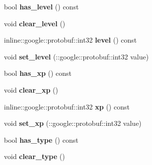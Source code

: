 \begin{DoxyCompactItemize}
\item 
\hypertarget{classproto_1_1_character_a7016b617afed8d8fad389e98e0334c08}{}bool {\bfseries has\+\_\+level} () const \label{classproto_1_1_character_a7016b617afed8d8fad389e98e0334c08}

\item 
\hypertarget{classproto_1_1_character_a3246999c221082b103293f9364c1ca53}{}void {\bfseries clear\+\_\+level} ()\label{classproto_1_1_character_a3246999c221082b103293f9364c1ca53}

\item 
\hypertarget{classproto_1_1_character_a3a41a2977c7f606776afdecdbc0632ad}{}inline\+::google\+::protobuf\+::int32 {\bfseries level} () const \label{classproto_1_1_character_a3a41a2977c7f606776afdecdbc0632ad}

\item 
\hypertarget{classproto_1_1_character_a98b7e3aa3ac98e40c07e09927ee56add}{}void {\bfseries set\+\_\+level} (\+::google\+::protobuf\+::int32 value)\label{classproto_1_1_character_a98b7e3aa3ac98e40c07e09927ee56add}

\item 
\hypertarget{classproto_1_1_character_a4d2ad8c78423b56dfc7a01ef406292f6}{}bool {\bfseries has\+\_\+xp} () const \label{classproto_1_1_character_a4d2ad8c78423b56dfc7a01ef406292f6}

\item 
\hypertarget{classproto_1_1_character_a574987e0da4ee8fd74cc4bebf3faf1ea}{}void {\bfseries clear\+\_\+xp} ()\label{classproto_1_1_character_a574987e0da4ee8fd74cc4bebf3faf1ea}

\item 
\hypertarget{classproto_1_1_character_a511446bb40bf4e2cd7eb19f26aed742d}{}inline\+::google\+::protobuf\+::int32 {\bfseries xp} () const \label{classproto_1_1_character_a511446bb40bf4e2cd7eb19f26aed742d}

\item 
\hypertarget{classproto_1_1_character_aaad1c4ee91ac67a99c1e9f16c0037756}{}void {\bfseries set\+\_\+xp} (\+::google\+::protobuf\+::int32 value)\label{classproto_1_1_character_aaad1c4ee91ac67a99c1e9f16c0037756}

\item 
\hypertarget{classproto_1_1_character_a3db0a177b06c58ca40b687b1a07fc677}{}bool {\bfseries has\+\_\+type} () const \label{classproto_1_1_character_a3db0a177b06c58ca40b687b1a07fc677}

\item 
\hypertarget{classproto_1_1_character_a6728f262cb977cfb8fd4286bf732d123}{}void {\bfseries clear\+\_\+type} ()\label{classproto_1_1_character_a6728f262cb977cfb8fd4286bf732d123}


\end{DoxyCompactItemize}
